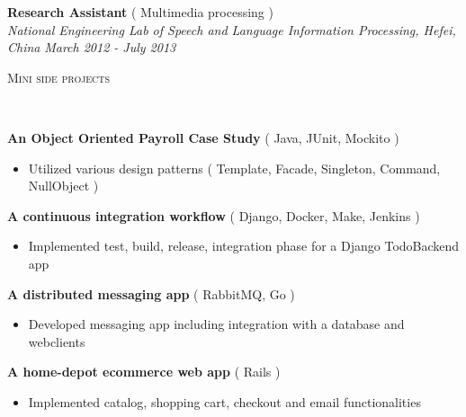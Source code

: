 \documentclass[3pt]{article}
\newenvironment{changemargin}[2]{%
  \begin{list}{}{%
    \setlength{\topsep}{0pt}%
    \setlength{\leftmargin}{#1}%
    \setlength{\rightmargin}{#2}%
    \setlength{\listparindent}{\parindent}%
    \setlength{\itemindent}{\parindent}%
    \setlength{\parsep}{\parskip}%
  }%
  \item[]}{\end{list}
}
\newcommand{\lineover}{
	\begin{changemargin}{-0.05in}{-0.05in}
		\vspace*{-8pt}
		\hrulefill \\
		\vspace*{-2pt}
	\end{changemargin}
}
\newcommand{\header}[1]{
	\begin{changemargin}{-0.5in}{-0.5in}
		{\Large \scshape{#1}}\\
  	\lineover
	\end{changemargin}
}
\newenvironment{body} {
	\vspace*{-16pt}
	\begin{changemargin}{-0.25in}{-0.5in}
  }	
	{\end{changemargin}
}
\begin{document}
\begin{body}
\begin{itemize}
    \end{itemize}
	
	\vspace{1pt}
    \textbf{Research Assistant} ( Multimedia processing )\\
    \emph{National Engineering Lab of Speech and Language Information Processing,  Hefei, China } \hfill \emph{March 2012 - July 2013 }

\end{body}


\smallskip

\header{Mini side projects}

\begin{body}
	\vspace{18pt}	

	\textbf{ An Object Oriented Payroll Case Study} ( Java, JUnit, Mockito ) 
     \begin{itemize} \itemsep -0pt
	\item{Utilized various design patterns ( Template, Facade, Singleton, Command, NullObject ) } 
           \end{itemize}	

	\textbf{ A continuous integration workflow} ( Django, Docker, Make, Jenkins ) 
     \begin{itemize} \itemsep -0pt
	\item{Implemented test, build, release, integration phase for a Django TodoBackend app } 
           \end{itemize}	

	\textbf{ A distributed messaging app} ( RabbitMQ, Go ) 
     \begin{itemize} \itemsep -0pt
	\item{Developed messaging app including integration with a database and webclients} 
           \end{itemize}	

	\textbf{ A home-depot ecommerce web app} ( Rails ) 
     \begin{itemize} \itemsep -0pt
	\item{Implemented catalog, shopping cart, checkout and email functionalities } 
           \end{itemize}	

\end{body}
\end{document}
